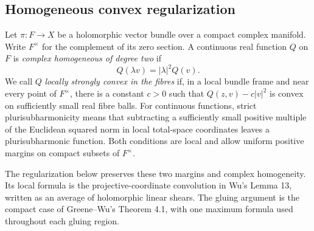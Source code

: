\subsection{Homogeneous convex regularization}
\label{subsec:homogeneous-convex-regularization}

Let $\pi:F\to X$ be a holomorphic vector bundle over a compact complex manifold. Write $F^\times$ for the complement of its zero section. A continuous real function $Q$ on $F$ is \emph{complex homogeneous of degree two} if
\[
 Q(\lambda v)=|\lambda|^2Q(v).
\]
We call $Q$ \emph{locally strongly convex in the fibres} if, in a local bundle frame and near every point of $F^\times$, there is a constant $c>0$ such that $Q(z,v)-c|v|^2$ is convex on sufficiently small real fibre balls. For continuous functions, strict plurisubharmonicity means that subtracting a sufficiently small positive multiple of the Euclidean squared norm in local total-space coordinates leaves a plurisubharmonic function. Both conditions are local and allow uniform positive margins on compact subsets of $F^\times$.

The regularization below preserves these two margins and complex homogeneity. Its local formula is the projective-coordinate convolution in Wu's Lemma 13, written as an average of holomorphic linear shears. The gluing argument is the compact case of Greene--Wu's Theorem 4.1, with one maximum formula used throughout each gluing region.

